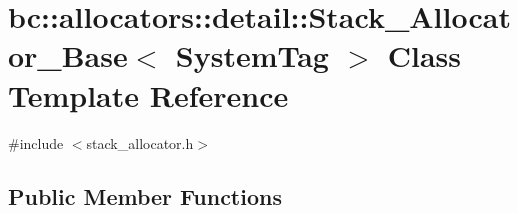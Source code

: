 \hypertarget{classbc_1_1allocators_1_1detail_1_1Stack__Allocator__Base}{}\section{bc\+:\+:allocators\+:\+:detail\+:\+:Stack\+\_\+\+Allocator\+\_\+\+Base$<$ System\+Tag $>$ Class Template Reference}
\label{classbc_1_1allocators_1_1detail_1_1Stack__Allocator__Base}


{\ttfamily \#include $<$stack\+\_\+allocator.\+h$>$}

\subsection*{Public Member Functions}

